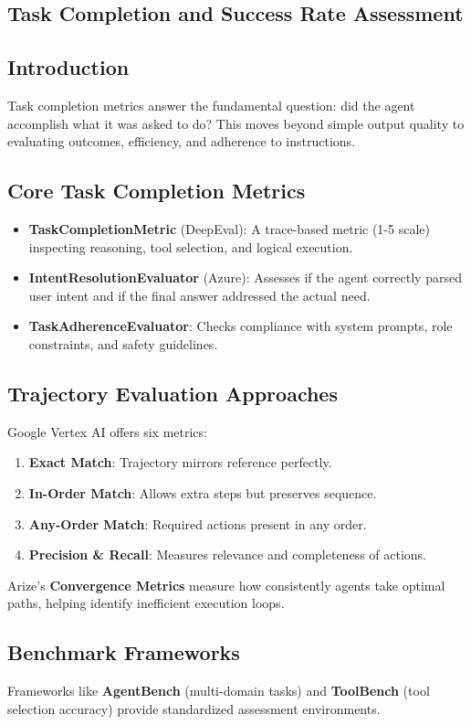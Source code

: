 \begin{TNtwocol}
\section{Task Completion and Success Rate Assessment }
\subsection{Introduction}
Task completion metrics answer the fundamental question: did the agent accomplish what it was asked to do? This moves beyond simple output quality to evaluating outcomes, efficiency, and adherence to instructions.

\subsection{Core Task Completion Metrics}
\begin{itemize}
    \item \textbf{TaskCompletionMetric} (DeepEval): A trace-based metric (1-5 scale) inspecting reasoning, tool selection, and logical execution.
    \item \textbf{IntentResolutionEvaluator} (Azure): Assesses if the agent correctly parsed user intent and if the final answer addressed the actual need.
    \item \textbf{TaskAdherenceEvaluator}: Checks compliance with system prompts, role constraints, and safety guidelines.
\end{itemize}

\subsection{Trajectory Evaluation Approaches}
Google Vertex AI offers six metrics:
\begin{enumerate}
    \item \textbf{Exact Match}: Trajectory mirrors reference perfectly.
    \item \textbf{In-Order Match}: Allows extra steps but preserves sequence.
    \item \textbf{Any-Order Match}: Required actions present in any order.
    \item \textbf{Precision \& Recall}: Measures relevance and completeness of actions.
\end{enumerate}
Arize's \textbf{Convergence Metrics} measure how consistently agents take optimal paths, helping identify inefficient execution loops.

\subsection{Benchmark Frameworks}
Frameworks like \textbf{AgentBench} (multi-domain tasks) and \textbf{ToolBench} (tool selection accuracy) provide standardized assessment environments.
\end{TNtwocol}
